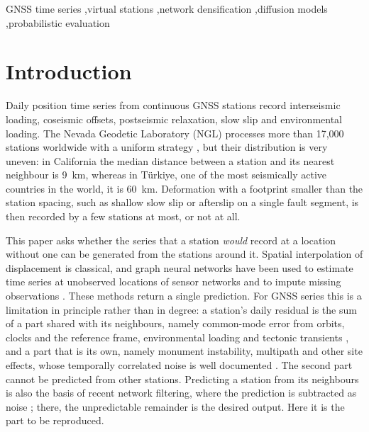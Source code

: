 \documentclass[preprint,12pt,authoryear]{elsarticle}
\begin{document}
\begin{frontmatter}
  \begin{keyword}
    GNSS time series \sep virtual stations \sep network densification \sep diffusion
    models \sep probabilistic evaluation
  \end{keyword}

\end{frontmatter}

\section{Introduction}
\label{sec:intro}

Daily position time series from continuous GNSS stations record interseismic loading,
coseismic offsets, postseismic relaxation, slow slip and environmental loading. The
Nevada Geodetic Laboratory (NGL) processes more than 17,000 stations worldwide with a
uniform strategy \citep{blewitt2018,ngl2026}, but their distribution is very uneven: in
California the median distance between a station and its nearest neighbour is 9~km,
whereas in T\"urkiye, one of the most seismically active countries in the world, it is
60~km. Deformation with a footprint smaller than the station spacing, such as shallow
slow slip or afterslip on a single fault segment, is then recorded by a few stations at
most, or not at all.

This paper asks whether the series that a station \emph{would} record at a location
without one can be generated from the stations around it. Spatial interpolation of
displacement is classical, and graph neural networks have been used to estimate time
series at unobserved locations of sensor networks \citep{wu2021ignnk} and to impute
missing observations \citep{cini2022grin,marisca2022spin}. These methods return a single
prediction. For GNSS series this is a limitation in principle rather than in degree: a
station's daily residual is the sum of a part shared with its neighbours, namely
common-mode error from orbits, clocks and the reference frame, environmental loading and
tectonic transients \citep{wdowinski1997,dong2006,kreemer2021,li2025loading}, and a part
that is its own, namely monument instability, multipath and other site effects, whose
temporally correlated noise is well documented \citep{williams2004,langbein2008}. The
second part cannot be predicted from other stations. Predicting a station from its
neighbours is also the basis of recent network filtering, where the prediction is
subtracted as noise \citep{bachelot2025}; there, the unpredictable remainder is the
desired output. Here it is the part to be reproduced.
\end{document}
